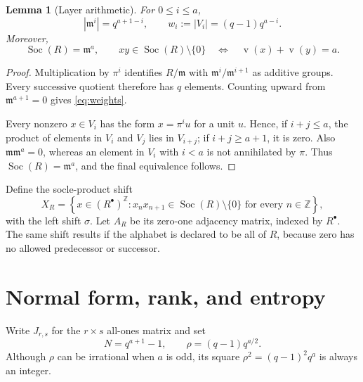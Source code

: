 \documentclass[11pt,a4paper]{amsart}
\newtheorem{lemma}[theorem]{Lemma}
\theoremstyle{definition}
\theoremstyle{remark}
\newcommand{\Z}{\mathbb Z}
\newcommand{\Soc}{\operatorname{Soc}}
\newcommand{\val}{\operatorname{v}}
\begin{document}
\begin{lemma}[Layer arithmetic]
\label{lem:valuation}
For $0\leq i\leq a$,
\begin{equation}\label{eq:weights}
 |\mathfrak m^i|=q^{a+1-i},
 \qquad
 w_i:=|V_i|=(q-1)q^{a-i}.
\end{equation}
Moreover,
\[
 \Soc(R)=\mathfrak m^a,
 \qquad
 xy\in\Soc(R)\setminus\{0\}
 \quad\Longleftrightarrow\quad
 \val(x)+\val(y)=a.
\]
\end{lemma}

\begin{proof}
Multiplication by $\pi^i$ identifies
$R/\mathfrak m$ with $\mathfrak m^i/\mathfrak m^{i+1}$ as additive groups.
Every successive quotient therefore has $q$ elements.  Counting upward from
$\mathfrak m^{a+1}=0$ gives \eqref{eq:weights}.

Every nonzero $x\in V_i$ has the form $x=\pi^i u$ for a unit $u$.  Hence, if
$i+j\leq a$, the product of elements in $V_i$ and $V_j$ lies in
$V_{i+j}$; if $i+j\geq a+1$, it is zero.  Also
$\mathfrak m\mathfrak m^a=0$, whereas an element in $V_i$ with $i<a$ is not
annihilated by $\pi$.  Thus $\Soc(R)=\mathfrak m^a$, and the final
equivalence follows.
\end{proof}

Define the socle-product shift
\begin{equation}\label{eq:shift}
 X_R=\left\{x\in(R^\bullet)^\Z:
 x_nx_{n+1}\in\Soc(R)\setminus\{0\}
 \text{ for every }n\in\Z\right\},
\end{equation}
with the left shift $\sigma$.  Let $A_R$ be its zero-one adjacency matrix,
indexed by $R^\bullet$.  The same shift results if the alphabet is declared
to be all of $R$, because zero has no allowed predecessor or successor.

\section{Normal form, rank, and entropy}
\label{sec:normal}

Write $J_{r,s}$ for the $r\times s$ all-ones matrix and set
\begin{equation}\label{eq:rho}
 N=q^{a+1}-1,
 \qquad
 \rho=(q-1)q^{a/2}.
\end{equation}
Although $\rho$ can be irrational when $a$ is odd, its square
$\rho^2=(q-1)^2q^a$ is always an integer.
\end{document}
